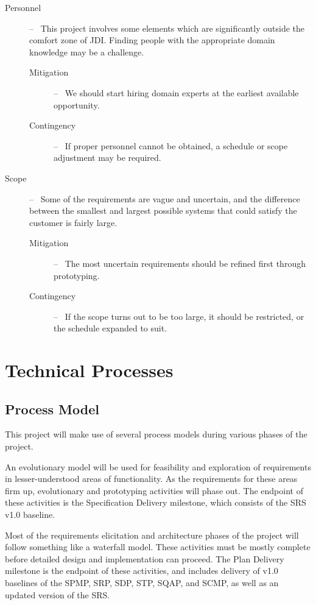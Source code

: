 \documentclass[11pt]{article}
\begin{document}
\begin{description}
\item[Personnel] --~ This project involves some elements which are significantly outside the comfort
  zone of JDI.  Finding people with the appropriate domain knowledge may be a challenge.
  \begin{description}
  \item[Mitigation] --~ We should start hiring domain experts at the earliest available opportunity.
  \item[Contingency] --~ If proper personnel cannot be obtained, a schedule or scope adjustment may
    be required.
  \end{description}
\item[Scope] --~ Some of the requirements are vague and uncertain, and the difference between the
  smallest and largest possible systems that could satisfy the customer is fairly large.
  \begin{description}
  \item[Mitigation] --~ The most uncertain requirements should be refined first through prototyping.
  \item[Contingency] --~ If the scope turns out to be too large, it should be restricted, or the
    schedule expanded to suit.
  \end{description}
\end{description}



\section{Technical Processes}
\subsection{Process Model}
This project will make use of several process models during various phases of the project.

An evolutionary model will be used for feasibility and exploration of requirements in
lesser-understood areas of functionality.  As the requirements for these areas firm up, evolutionary
and prototyping activities will phase out.  The endpoint of these activities is the Specification
Delivery milestone, which consists of the SRS v1.0 baseline.

Most of the requirements elicitation and architecture phases of the project will follow something
like a waterfall model.  These activities must be mostly complete before detailed design and
implementation can proceed.  The Plan Delivery milestone is the endpoint of these activities, and
includes delivery of v1.0 baselines of the SPMP, SRP, SDP, STP, SQAP, and SCMP, as well as an
updated version of the SRS.
\end{document}
